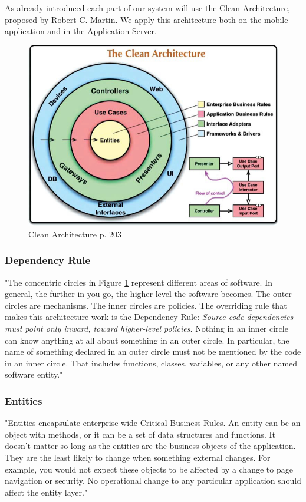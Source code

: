 
As already introduced each part of our system will use the Clean Architecture, proposed by Robert C. Martin. We apply this architecture both on the mobile application and in the Application Server.

\begin{figure}
\centering
\includegraphics[width=\textwidth]{Images/cleanArchi.pdf}
\caption{\label{fig:cleanArchi} Clean Architecture \cite{clean} p. 203}
\end{figure}

\subsubsection{Dependency Rule}
"The concentric circles in Figure \ref{fig:cleanArchi} represent different areas of software. In general, the further in you go, the higher level the software becomes. The outer circles are mechanisms. The inner circles are policies.
The overriding rule that makes this architecture work is the Dependency Rule:
\textit{Source code dependencies must point only inward, toward higher-level policies.}
Nothing in an inner circle can know anything at all about something in an outer circle. In particular, the name of something declared in an outer circle must not be mentioned by the code in an inner circle. That includes functions, classes, variables, or any other named software entity." \cite{clean}

\subsubsection{Entities}
"Entities encapsulate enterprise-wide Critical Business Rules. An entity can be an object with methods, or it can be a set of data structures and functions. It doesn’t matter so long as the entities are the business objects of the application. They are the least likely to change when something external changes. For example, you would not expect these objects to be affected by a change to page navigation or security. No operational change to any particular application should affect the entity layer." \cite{clean}

